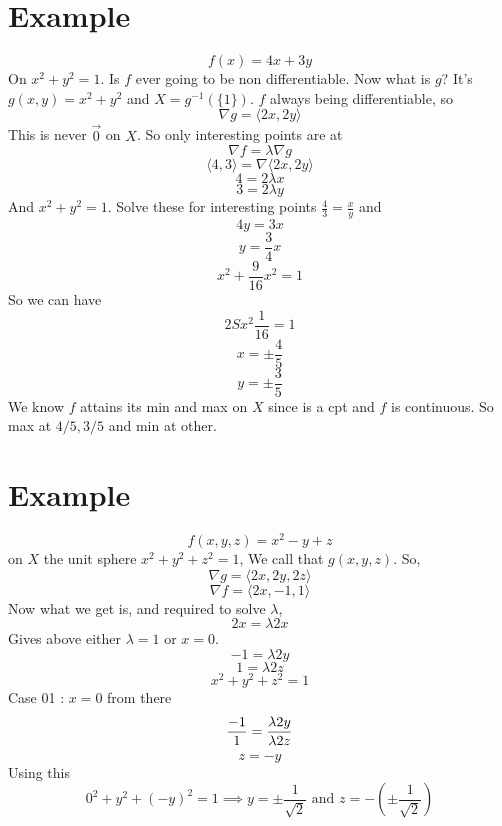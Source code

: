 \documentclass[letter]{article}
\title{}
\author{Ahmed Saad Sabit, Rice University}
\date{\today}
\begin{document}
\maketitle
{}


\section*{Example}
\[
f(x) = 4x + 3y 
\]
On $x^2 + y^2 = 1$. Is $f$ ever going to be non differentiable. Now what is $g$? It's $g(x,y)= x^2 + y^2 $ and $X = g^{-1}(\{1\} )$. $f$ always being differentiable, so 
\[
\nabla g = \langle 2x, 2y \rangle
\]
This is never $\vec{0}$ on $X$. So only interesting points are at
\[
\nabla f = \lambda \nabla g
\] 
\[
\langle 4,3 \rangle = \nabla \langle 2x , 2y \rangle
\]
\[
4 = 2 \lambda x
\] 
\[
3 = 2 \lambda y
\] 
And 
$x^2 + y^2 = 1$. Solve these for interesting points $\frac{4}{3} = \frac{x}{y}$ and 
\[
4y = 3x
\]
\[
 y= \frac{3}{4} x
\] 
\[
x^2 + \frac{9}{16} x^2 = 1
\] 
So we can have
\[
2 S x^2 \frac{1}{16} = 1
\] 
\[
x = \pm \frac{4}{5}
\] 
\[
y = \pm \frac{3}{5}
\] 
We know $f$ attains its min and max on $X$ since is a cpt and $f$ is continuous. So max at $4 / 5 , 3 / 5$ and min at other. 

\section*{Example}
\[
f(x,y,z) = x^2 - y + z
\] 
on $X$ the unit sphere $x^2 + y^2 + z^2 = 1$, 
We call that $g(x,y,z)$. So,
\[
\nabla g = \langle 2x, 2y, 2z \rangle
\] 
\[
\nabla f = \langle 2x, -1, 1 \rangle
\] 
Now what we get is, and required to solve $\lambda$, 
\[
2x = \lambda 2x
\]
Gives above either $\lambda = 1$ or $x = 0$. 
\[
-1 = \lambda 2y
\] 
\[
1 = \lambda 2 z
\] 
\[
x^2 + y^2 + z^2 = 1
\]
Case 01 : $x = 0$ from there 
\[
	{-1 \over 1} = { \lambda 2 y \over  \lambda 2 z } 
\] 
\[
z = - y 
\] 
Using this 
\[
0 ^2 + y^2 + (-y)^2 = 1 \implies y = \pm \frac{1}{\sqrt{2} } \text{ and } z = - \left(\pm \frac{1}{\sqrt{2} }\right)
\] 
\end{document}
